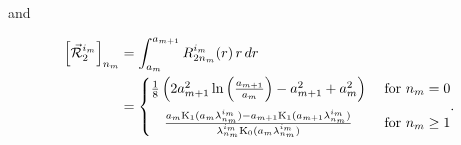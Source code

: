 \noindent and

\begin{equation}\label{jfm:radial integral 2}
\begin{aligned}\relax
    \left[\vec{\mathcal{R}}_{2}^{i_m}\right]_{n_m} 
    & = \int_{a_{m}}^{a_{{m+1}}} R_{2n_m}^{i_m}(r)\, r\, dr \\
    & = \left\{\begin{matrix}
    \frac{1}{8} \left(2 a_{{m+1}}^2 \ln \left(\frac{a_{{m+1}}}{a_{m}}\right)-a_{{m+1}}^2+a_{m}^2\right) 
    & 
    \text{ for } n_m=0 \\[2ex]
 \frac{
        a_m \mathrm{K}_1(a_m \lambda^{i_m}_{n_m})-a_{{m+1}} \mathrm{K}_1(a_{{m+1}} \lambda^{i_m}_{n_m})
        }{
        \lambda^{i_m}_{n_m} \mathrm{K}_0(a_m \lambda^{i_m}_{n_m})
        } 
 &
  \text{ for } n_m \ge 1
\end{matrix}.\right.
\end{aligned}
\end{equation}